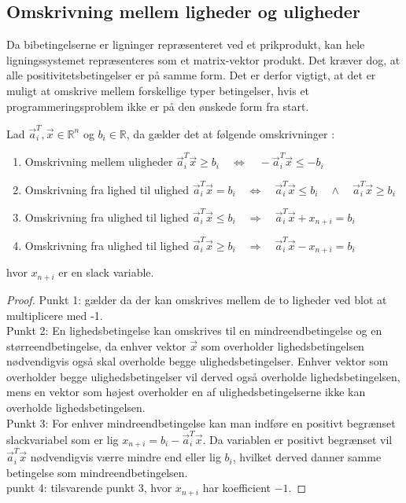 \subsection{Omskrivning mellem ligheder og uligheder}
Da bibetingelserne er ligninger repræsenteret ved et prikprodukt, kan hele ligningssystemet repræsenteres som et matrix-vektor produkt. Det kræver dog, at alle positivitetsbetingelser er på samme form. 
Det er derfor vigtigt, at det er muligt at omskrive mellem forskellige typer betingelser, hvis et programmeringsproblem ikke er på den ønskede form fra start.

\begin{stn}
Lad $\vec{a}_i^T,\vec{x} \in \mathds{R}^n$ og $b_i \in \mathds{R}$, da gælder det at følgende omskrivninger :
\begin{enumerate}
\item Omskrivning mellem uligheder \qquad \quad $\vec{a}_i^T\vec{x} \geq b_i \quad \Leftrightarrow \quad -\vec{a}_i^T\vec{x} \leq -b_i$
\item Omskrivning fra lighed til ulighed \qquad  $\vec{a}_i^T\vec{x} = b_i \quad \Leftrightarrow  \quad  \vec{a}_i^T\vec{x} \leq b_i \quad \wedge \quad  \vec{a}_i^T\vec{x} \geq b_i$
\item Omskrivning fra ulighed til lighed \qquad $\vec{a}_i^T \vec{x}  \leq b_i \quad \Rightarrow \quad  \vec{a}_i^T \vec{x}  +  x_{n+i}  = b_i$
\item Omskrivning fra ulighed til lighed \qquad $\vec{a}_i^T \vec{x}  \geq b_i \quad \Rightarrow \quad  \vec{a}_i^T \vec{x}  - x_{n+i}  = b_i$
\end{enumerate}
hvor $x_{n+i}$ er en slack variable.
\label{stn:omskr_ligulig} 
\end{stn}

\begin{proof}
Punkt 1: gælder da der kan omskrives mellem de to ligheder ved blot at multiplicere med -1.\\
Punkt 2: En lighedsbetingelse kan omskrives til en mindreendbetingelse og en størreendbetingelse, da enhver vektor $\vec{x}$ som overholder lighedsbetingelsen nødvendigvis også skal overholde begge ulighedsbetingelser. Enhver vektor som overholder begge ulighedsbetingelser vil derved også overholde lighedsbetingelsen, mens en vektor som højest overholder en af ulighedsbetingelserne ikke kan overholde lighedsbetingelsen.\\
Punkt 3: For enhver mindreendbetingelse kan man indføre en positivt begrænset slackvariabel som er lig $x_{n+i}  = b_i - \vec{a}_i^T \vec{x}$. Da variablen er positivt begrænset vil $\vec{a}_i^T \vec{x}$ nødvendigvis værre mindre end eller lig $b_i$, hvilket derved danner samme betingelse som mindreendbetingelsen.\\
punkt 4: tilsvarende punkt 3, hvor $x_{n+i}$ har koefficient $-1$.
\end{proof}

